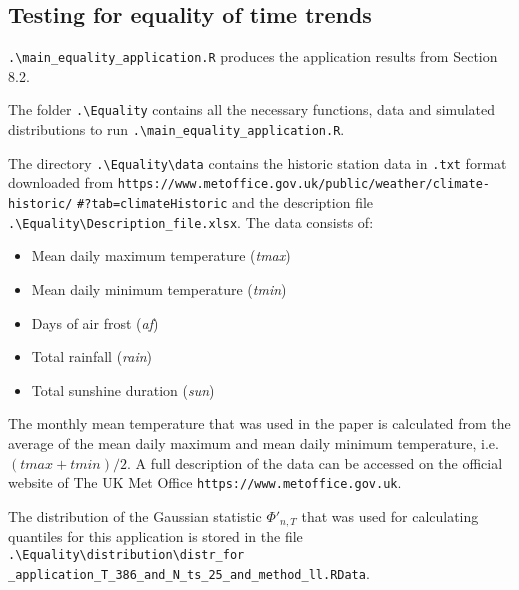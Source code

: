 \documentclass[a4paper,12pt]{article}
\begin{document}


\subsection*{Testing for equality of time trends}


\verb|.\main_equality_application.R| produces the application results from Section 8.2. 

The folder \verb|.\Equality| contains all the necessary functions, data and simulated distributions to run \verb|.\main_equality_application.R|. 

The directory \verb|.\Equality\data| contains the historic station data in \verb|.txt| format downloaded from 
\verb|https://www.metoffice.gov.uk/public/weather/climate-historic/| \verb|#?tab=climateHistoric|
and the description file \verb|.\Equality\Description_file.xlsx|. The data consists of:
\begin{itemize}
\setlength{\itemsep}{0cm}
\item Mean daily maximum temperature (\textit{tmax})
\item Mean daily minimum temperature (\textit{tmin})
\item Days of air frost (\textit{af})
\item Total rainfall (\textit{rain})
\item Total sunshine duration (\textit{sun})
\end{itemize}
The monthly mean temperature that was used in the paper is calculated from the average of the mean daily maximum and mean daily minimum temperature, i.e.\ $(tmax+tmin)/2$. A full description of the data can be accessed on the official website of The UK Met Office \verb|https://www.metoffice.gov.uk|. 

The distribution of the Gaussian statistic $\Phi'_{n, T}$ that was used for calculating quantiles for this application is stored in the file
\verb|.\Equality\distribution\distr_for| \verb|_application_T_386_and_N_ts_25_and_method_ll.RData|.


\end{document}
